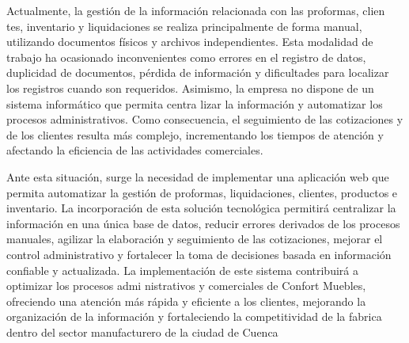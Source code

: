 Actualmente, la gestión de la información relacionada con las proformas, clien
tes, inventario y liquidaciones se realiza principalmente de forma manual, utilizando
documentos físicos y archivos independientes. Esta modalidad de trabajo ha ocasionado
inconvenientes como errores en el registro de datos, duplicidad de documentos, pérdida
de información y dificultades para localizar los registros cuando son requeridos.
Asimismo, la empresa no dispone de un sistema informático que permita centra
lizar la información y automatizar los procesos administrativos. Como consecuencia, el
seguimiento de las cotizaciones y de los clientes resulta más complejo, incrementando
los tiempos de atención y afectando la eficiencia de las actividades comerciales.

Ante esta situación, surge la necesidad de implementar una aplicación web
que permita automatizar la gestión de proformas, liquidaciones, clientes, productos
e inventario. La incorporación de esta solución tecnológica permitirá centralizar la
información en una única base de datos, reducir errores derivados de los procesos
manuales, agilizar la elaboración y seguimiento de las cotizaciones, mejorar el control
administrativo y fortalecer la toma de decisiones basada en información confiable y
actualizada.
La implementación de este sistema contribuirá a optimizar los procesos admi
nistrativos y comerciales de Confort Muebles, ofreciendo una atención más rápida y
eficiente a los clientes, mejorando la organización de la información y fortaleciendo la
competitividad de la fabrica dentro del sector manufacturero de la ciudad de Cuenca